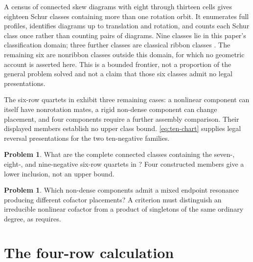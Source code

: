 \documentclass[11pt,a4paper]{amsart}
\numberwithin{equation}{section}
\theoremstyle{plain}
\theoremstyle{definition}
\newtheorem{problem}[theorem]{Problem}
\begin{document}
A census of connected skew diagrams with eight through thirteen cells
gives eighteen Schur classes containing more than one rotation orbit.
It enumerates full profiles, identifies diagrams up to translation and
rotation, and counts each Schur class once rather than counting pairs of
diagrams.  Nine classes lie in this paper's classification domain; three
further classes are classical ribbon classes
\cite{Billera2006DecomposableCompositions}.  The remaining six are
nonribbon classes outside this domain, for which no geometric account is
asserted here.  This is a bounded frontier, not a proportion of the general
problem solved and not a claim that those six classes admit no legal
presentations.

The six-row quartets in  exhibit three
remaining cases: a nonlinear component can itself have nonrotation mates,
a rigid non-dense component can change placement, and four components
require a further assembly comparison.  Their displayed members establish
no upper class bound.  \eqref{eq:ten-chart} supplies legal reversal
presentations for the two ten-negative families.

\begin{problem}\label{prob:quartet-exhaustion}
What are the complete connected classes containing the seven-, eight-,
and nine-negative six-row quartets in ?
Four constructed members give a lower inclusion, not an upper bound.
\end{problem}

\begin{problem}\label{prob:placement-resonances}
Which non-dense components admit a mixed endpoint resonance producing
different cofactor placements?  A criterion must distinguish an
irreducible nonlinear cofactor from a product of singletons of the same
ordinary degree, as  requires.
\end{problem}

\appendix
\section{The four-row calculation}\label{app:four}
\end{document}
